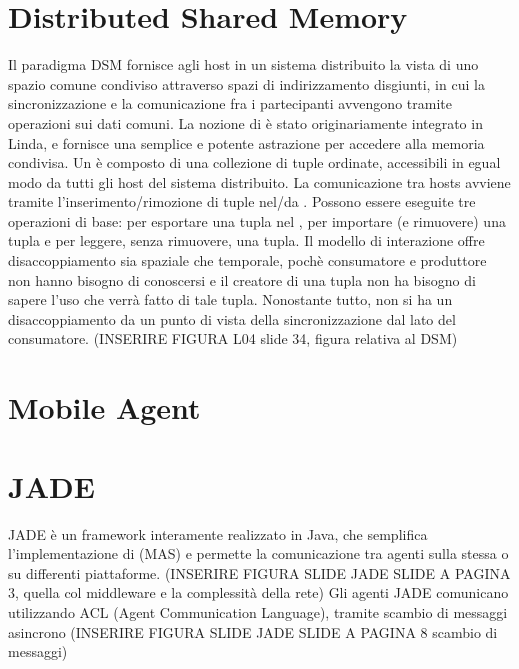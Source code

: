 \section{Distributed Shared Memory}
Il paradigma DSM fornisce agli host in un sistema distribuito la vista di uno spazio comune condiviso attraverso spazi di indirizzamento disgiunti, in cui la sincronizzazione e la comunicazione fra i partecipanti avvengono tramite operazioni sui dati comuni. La nozione di  è stato originariamente integrato in Linda, e fornisce una semplice e potente astrazione per accedere alla memoria condivisa. Un  è composto di una collezione di tuple ordinate, accessibili in egual modo da tutti gli host del sistema distribuito. La comunicazione tra hosts avviene tramite l'inserimento/rimozione di tuple nel/da . Possono essere eseguite tre operazioni di base:  per esportare una tupla nel ,  per importare (e rimuovere) una tupla e  per leggere, senza rimuovere, una tupla. Il modello di interazione offre disaccoppiamento sia spaziale che temporale, pochè consumatore e produttore non hanno bisogno di conoscersi e il creatore di una tupla non ha bisogno di sapere l'uso che verrà fatto di tale tupla. Nonostante tutto, non si ha un disaccoppiamento da un punto di vista della sincronizzazione dal lato del consumatore. 
(INSERIRE FIGURA L04 slide 34, figura relativa al DSM)
\section{Mobile Agent}

\section{JADE}
JADE è un framework interamente realizzato in Java, che semplifica l'implementazione di  (MAS) e permette la comunicazione tra agenti sulla stessa o su differenti piattaforme.
(INSERIRE FIGURA SLIDE JADE SLIDE A PAGINA 3, quella col middleware e la complessità della rete)
Gli agenti JADE comunicano utilizzando ACL (Agent Communication Language), tramite scambio di messaggi asincrono
(INSERIRE FIGURA SLIDE JADE SLIDE A PAGINA 8 scambio di messaggi)  